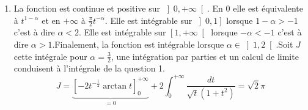 \begin{enumerate}
\emph{2}$^{\grave{e}me}$\emph{\ m{\'e}thode : factorisation r{\'e}elle et
th{\'e}or{\`e}me de Bezout}\newline On commence par factoriser le
d{\'e}nominateur :
\[
1+u^{4}=(1+u^{2})^{2}-2u^{2}=(1+\sqrt{2}u+u^{2})(1-\sqrt{2}u+u^{2})
\]
Posons $A=1+\sqrt{2}u+u^{2}$, $B=1-\sqrt{2}u+u^{2}$ alors
\begin{eqnarray*}
A-B &=&2\sqrt{2}u,\quad B=1-2\sqrt{2}u(\frac{1}{2}-\frac{1}{2\sqrt{2}}u) \\
1 &=&(\frac{1}{2}-\frac{1}{2\sqrt{2}}u)\,A+(\frac{1}{2}+\frac{1}{2\sqrt{2}}%
u)\,B \\
\frac{1}{1+u^{4}} &=&\frac{\frac{1}{2}+\frac{1}{2\sqrt{2}}u}{1+\sqrt{2}%
u+u^{2}}+\frac{\frac{1}{2}-\frac{1}{2\sqrt{2}}u}{1-\sqrt{2}u+u^{2}}
\end{eqnarray*}
\begin{eqnarray*}
\frac{1}{1+u^{4}}
&=&\frac{1}{4\sqrt{2}}\frac{2u+\sqrt{2}}{1+\sqrt{2}u+u^{2}}+\frac{1}{4}\frac{1}{1+\sqrt{2}u+u^{2}}\\
&\phantom{f}& \quad -\frac{1}{4\sqrt{2}}\frac{2u-\sqrt{2}}{%
1-\sqrt{2}u+u^{2}}+\frac{1}{4}\frac{1}{1-\sqrt{2}u+u^{2}}
\end{eqnarray*}
On en d{\'e}duit la primitive
\[
\frac{1}{4\sqrt{2}}\ln \frac{1+\sqrt{2}u+u^{2}}{1-\sqrt{2}u+u^{2}}+\frac{1}{2%
\sqrt{2}}\arctan (\sqrt{2}u+1)+\frac{1}{2\sqrt{2}}\arctan
(\sqrt{2}u-1)
\]
En passant {\`a} la limite, on observe {\`a} nouveau l'annulation des
logarithmes et $I=\frac{\pi }{\sqrt{2}}$.

\item  La fonction est continue et positive sur $\left] 0,+\infty \right[ $.
En $0$ elle est {\'e}quivalente {\`a} $t^{1-\alpha }$ et en $+\infty $ {\`a}
$\frac{\pi }{2}t^{-\alpha }.$ Elle est int{\'e}grable sur $\left]
0,1\right] $ lorsque $1-\alpha >-1$ c'est {\`a} dire $\alpha <2$. Elle
est int{\'e}grable sur $\left[ 1,+\infty \right[ $ lorsque $-\alpha
<-1$ c'est {\`a} dire $\alpha >1$.\newline Finalement, la fonction est
int{\'e}grable lorsque $\alpha \in \left] 1,2\right[ $.\newline Soit
$J$ cette int{\'e}grale pour $\alpha =\frac{3}{2}$, une int{\'e}gration
par parties et un calcul de limite conduisent {\`a} l'int{\'e}grale de la
question 1.
\[
J=\underset{=0}{\underbrace{\left[ -2t^{-\frac{1}{2}}\arctan
t\right]
_{0}^{+\infty }}}+2\int_{0}^{+\infty }\frac{dt}{\sqrt{t}(1+t^{2})}=\sqrt{2}%
\pi
\]
\end{enumerate}
